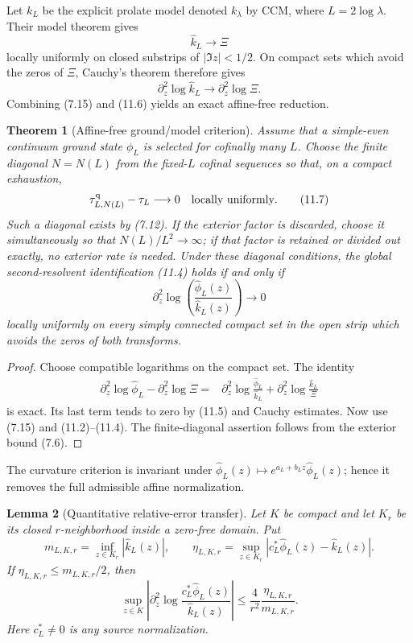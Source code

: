 \documentclass[11pt]{amsart}
\newtheorem{theorem}{Theorem}[section]
\newtheorem{lemma}[theorem]{Lemma}
\theoremstyle{definition}
\theoremstyle{remark}
\newcommand{\XiR}{\Xi}
\begin{document}
Let \(k_L\) be the explicit prolate model denoted \(k_\lambda\) by CCM,
where \(L=2\log\lambda\).  Their model theorem gives
\[
 \widehat k_L\longrightarrow\XiR
\tag{11.5}
\]
locally uniformly on closed substrips of \(|\Im z|<1/2\).  On compact sets
which avoid the zeros of \(\XiR\), Cauchy's theorem therefore gives
\[
 \partial_z^2\log\widehat k_L
 \longrightarrow\partial_z^2\log\XiR.
\tag{11.6}
\]
Combining (7.15) and (11.6) yields an exact affine-free reduction.

\begin{theorem}[Affine-free ground/model criterion]
Assume that a simple-even continuum ground state \(\phi_L\) is selected for
cofinally many \(L\).  Choose the finite diagonal \(N=N(L)\) from the
fixed-\(L\) cofinal sequences so that, on a compact exhaustion,
\[
 \tau_{L,N(L)}^{\rm q}-\tau_L\longrightarrow0
 \quad\text{locally uniformly}.
\tag{11.7}
\]
Such a diagonal exists by (7.12).  If the exterior factor is discarded,
choose it simultaneously so that \(N(L)/L^2\to\infty\); if that factor is
retained or divided out exactly, no exterior rate is needed.  Under these
diagonal conditions, the global second-resolvent identification (11.4)
holds if and only if
\[
\boxed{
 \partial_z^2\log
 \left(\frac{\widehat\phi_L(z)}{\widehat k_L(z)}\right)
 \longrightarrow0}
\tag{11.8}
\]
locally uniformly on every simply connected compact set in the open strip
which avoids the zeros of both transforms.
\end{theorem}

\begin{proof}
Choose compatible logarithms on the compact set.  The identity
\[
\begin{aligned}
 \partial_z^2\log\widehat\phi_L-\partial_z^2\log\XiR
={}&\partial_z^2\log\frac{\widehat\phi_L}{\widehat k_L}
 +\partial_z^2\log\frac{\widehat k_L}{\XiR}
\end{aligned}
\tag{11.9}
\]
is exact.  Its last term tends to zero by (11.5) and Cauchy estimates.
Now use (7.15) and (11.2)--(11.4).  The finite-diagonal assertion follows
from the exterior bound (7.6).
\end{proof}

The curvature criterion is invariant under
\(\widehat\phi_L(z)\mapsto e^{a_L+b_Lz}\widehat\phi_L(z)\); hence it removes
the full admissible affine normalization.

\begin{lemma}[Quantitative relative-error transfer]
Let \(K\) be compact and let \(K_r\) be its closed \(r\)-neighborhood
inside a zero-free domain.  Put
\[
 m_{L,K,r}=\inf_{z\in K_r}|\widehat k_L(z)|,
 \qquad
 \eta_{L,K,r}=\sup_{z\in K_r}
 |c_L^*\widehat\phi_L(z)-\widehat k_L(z)|.
\tag{11.10}
\]
If \(\eta_{L,K,r}\le m_{L,K,r}/2\), then
\[
\boxed{
 \sup_{z\in K}\left|
 \partial_z^2\log\frac{c_L^*\widehat\phi_L(z)}{\widehat k_L(z)}
 \right|
 \le\frac4{r^2}\frac{\eta_{L,K,r}}{m_{L,K,r}}.}
\tag{11.11}
\]
Here \(c_L^*\ne0\) is any source normalization.
\end{lemma}
\end{document}
